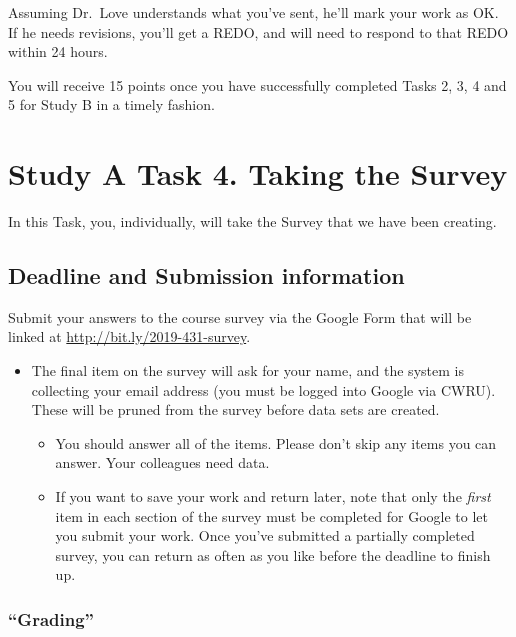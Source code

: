 \documentclass[]{book}
\providecommand{\tightlist}{%
  \setlength{\itemsep}{0pt}\setlength{\parskip}{0pt}}
\begin{document}
Assuming Dr.~Love understands what you've sent, he'll mark your work as OK. If he needs revisions, you'll get a REDO, and will need to respond to that REDO within 24 hours.

You will receive 15 points once you have successfully completed Tasks 2, 3, 4 and 5 for Study B in a timely fashion.

\hypertarget{task4a}{%
\chapter{Study A Task 4. Taking the Survey}\label{task4a}}

In this Task, you, individually, will take the Survey that we have been creating.

\hypertarget{deadline-and-submission-information-5}{%
\section{Deadline and Submission information}\label{deadline-and-submission-information-5}}

Submit your answers to the course survey via the Google Form that will be linked at \url{http://bit.ly/2019-431-survey}.

\begin{itemize}
\tightlist
\item
  The final item on the survey will ask for your name, and the system is collecting your email address (you must be logged into Google via CWRU). These will be pruned from the survey before data sets are created.

  \begin{itemize}
  \tightlist
  \item
    You should answer all of the items. Please don't skip any items you can answer. Your colleagues need data.
  \item
    If you want to save your work and return later, note that only the \emph{first} item in each section of the survey must be completed for Google to let you submit your work. Once you've submitted a partially completed survey, you can return as often as you like before the deadline to finish up.
  \end{itemize}
\end{itemize}

\hypertarget{grading-5}{%
\subsection{``Grading''}\label{grading-5}}
\end{document}
